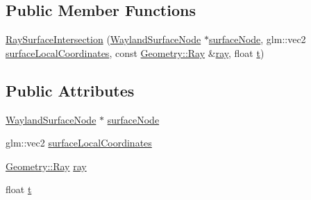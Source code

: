 \subsection*{Public Member Functions}
\begin{DoxyCompactItemize}
\item 
\hyperlink{structmotorcar_1_1Geometry_1_1RaySurfaceIntersection_a25998175e122ecae30e93f823b3b84e4}{Ray\-Surface\-Intersection} (\hyperlink{classmotorcar_1_1WaylandSurfaceNode}{Wayland\-Surface\-Node} $\ast$\hyperlink{structmotorcar_1_1Geometry_1_1RaySurfaceIntersection_aaea662da642316b521721a5dcff0a280}{surface\-Node}, glm\-::vec2 \hyperlink{structmotorcar_1_1Geometry_1_1RaySurfaceIntersection_abb64ad1bdb4385d23970b1c7ecd4afaa}{surface\-Local\-Coordinates}, const \hyperlink{structmotorcar_1_1Geometry_1_1Ray}{Geometry\-::\-Ray} \&\hyperlink{structmotorcar_1_1Geometry_1_1RaySurfaceIntersection_a2e53423ad071c4587aac822ee6aa3de9}{ray}, float \hyperlink{structmotorcar_1_1Geometry_1_1RaySurfaceIntersection_af32545772aead85519b20869fbc34284}{t})
\end{DoxyCompactItemize}
\subsection*{Public Attributes}
\begin{DoxyCompactItemize}
\item 
\hyperlink{classmotorcar_1_1WaylandSurfaceNode}{Wayland\-Surface\-Node} $\ast$ \hyperlink{structmotorcar_1_1Geometry_1_1RaySurfaceIntersection_aaea662da642316b521721a5dcff0a280}{surface\-Node}
\item 
glm\-::vec2 \hyperlink{structmotorcar_1_1Geometry_1_1RaySurfaceIntersection_abb64ad1bdb4385d23970b1c7ecd4afaa}{surface\-Local\-Coordinates}
\item 
\hyperlink{structmotorcar_1_1Geometry_1_1Ray}{Geometry\-::\-Ray} \hyperlink{structmotorcar_1_1Geometry_1_1RaySurfaceIntersection_a2e53423ad071c4587aac822ee6aa3de9}{ray}
\item 
float \hyperlink{structmotorcar_1_1Geometry_1_1RaySurfaceIntersection_af32545772aead85519b20869fbc34284}{t}
\end{DoxyCompactItemize}


